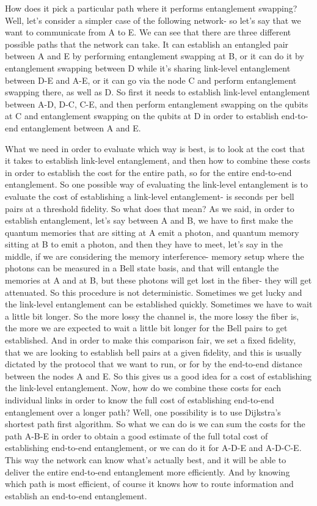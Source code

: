 How does it pick a particular path where it performs entanglement swapping? Well, let's consider a simpler case of the following network- so let's say that we want to communicate from A to E. We can see that there are three different possible paths that the network can take. It can establish an entangled pair between A and E by performing entanglement swapping at B, or it can do it by entanglement swapping between D while it's sharing link-level entanglement between D-E and A-E, or it can go via the node C and perform entanglement swapping there, as well as D. So first it needs to establish link-level entanglement between A-D, D-C, C-E, and then perform entanglement swapping on the qubits at C and entanglement swapping on the qubits at D in order to establish end-to-end entanglement between A and E.

What we need in order to evaluate which way is best, is to look at the cost that it takes to establish link-level entanglement, and then how to combine these costs in order to establish the cost for the entire path, so for the entire end-to-end entanglement. So one possible way of evaluating the link-level entanglement is to evaluate the cost of establishing a link-level entanglement- is seconds per bell pairs at a threshold fidelity. So what does that mean? As we said, in order to establish entanglement, let's say between A and B, we have to first make the quantum memories that are sitting at A emit a photon, and quantum memory sitting at B to emit a photon, and then they have to meet, let's say in the middle, if we are considering the memory interference- memory setup where the photons can be measured in a Bell state basis, and that will entangle the memories at A and at B, but these photons will get lost in the fiber- they will get attenuated. So this procedure is not deterministic. Sometimes we get lucky and the link-level entanglement can be established quickly. Sometimes we have to wait a little bit longer. So the more lossy the channel is, the more lossy the fiber is, the more we are expected to wait a little bit longer for the Bell pairs to get established. And in order to make this comparison fair, we set a fixed fidelity, that we are looking to establish bell pairs at a given fidelity, and this is usually dictated by the protocol that we want to run, or for by the end-to-end distance between the nodes A and E. So this gives us a good idea for a cost of establishing the link-level entanglement. Now, how do we combine these costs for each individual links in order to know the full cost of establishing end-to-end entanglement over a longer path? Well, one possibility is to use Dijkstra's shortest path first algorithm. So what we can do is we can sum the costs for the path A-B-E in order to obtain a good estimate of the full total cost of establishing end-to-end entanglement, or we can do it for A-D-E and A-D-C-E. This way the network can know what's actually best, and it will be able to deliver the entire end-to-end entanglement more efficiently. And by knowing which path is most efficient, of course it knows how to route information and establish an end-to-end entanglement.

